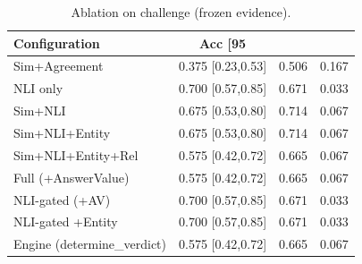 \begin{table}[t]
\centering
\caption{Ablation on challenge (frozen evidence).}
\label{tab:ablation_challenge}
\small
\begin{tabular}{lccc}
\hline
Configuration & Acc [95\\%
\hline
Sim+Agreement & 0.375 [0.23,0.53] & 0.506 & 0.167 \\
NLI only & 0.700 [0.57,0.85] & 0.671 & 0.033 \\
Sim+NLI & 0.675 [0.53,0.80] & 0.714 & 0.067 \\
Sim+NLI+Entity & 0.675 [0.53,0.80] & 0.714 & 0.067 \\
Sim+NLI+Entity+Rel & 0.575 [0.42,0.72] & 0.665 & 0.067 \\
Full (+AnswerValue) & 0.575 [0.42,0.72] & 0.665 & 0.067 \\
NLI-gated (+AV) & 0.700 [0.57,0.85] & 0.671 & 0.033 \\
NLI-gated +Entity & 0.700 [0.57,0.85] & 0.671 & 0.033 \\
Engine (determine\_verdict) & 0.575 [0.42,0.72] & 0.665 & 0.067 \\
\hline
\end{tabular}
\end{table}